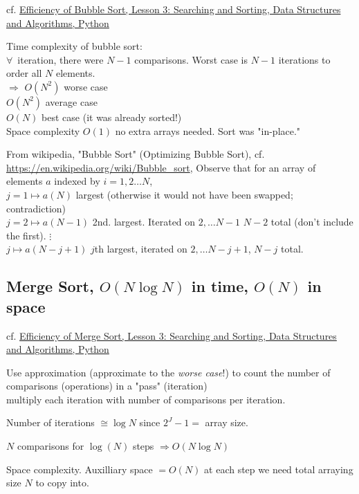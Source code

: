 \documentclass[10pt]{amsart}
\begin{document}
cf. \href{https://classroom.udacity.com/courses/ud513/lessons/7123524086/concepts/71191848070923}{Efficiency of Bubble Sort, Lesson 3: Searching and Sorting, Data Structures and Algorithms, Python}

Time complexity of bubble sort: \\
$\forall \, $ iteration, there were $N-1$ comparisons. Worst case is $N - 1$ iterations to order all $N$ elements. \\
$\Longrightarrow $ $O(N^2)$ worse case \\
\phantom{$\Longrightarrow$} $O(N^2)$ average case \\
\phantom{$\Longrightarrow$} $O(N)$ best case (it was already sorted!) \\

Space complexity $O(1)$ no extra arrays needed. Sort was "in-place."

From wikipedia, "Bubble Sort" (Optimizing Bubble Sort), cf. \url{https://en.wikipedia.org/wiki/Bubble_sort}, Observe that for an array of elements $a$ indexed by $i = 1, 2 \dots N$,  \\
$j = 1 \mapsto a(N) $ largest (otherwise it would not have been swapped; contradiction) \\
$j = 2 \mapsto a(N-1)$ 2nd. largest. Iterated on $ 2, \dots N-1$ $N-2$ total (don't include the first).
$ \vdots$ \\
$ j \mapsto a(N-j +1)$ $j$th largest, iterated on $2, \dots N- j +1$, $N-j$ total.

\subsection{Merge Sort, $O(N \log{N})$ in time, $O(N)$ in space}

cf. \href{https://classroom.udacity.com/courses/ud513/lessons/7123524086/concepts/71254347930923}{Efficiency of Merge Sort, Lesson 3: Searching and Sorting, Data Structures and Algorithms, Python}

Use approximation (approximate to the \emph{worse case}!) to count the number of comparisons (operations) in a "pass" (iteration) \\
multiply each iteration with number of comparisons per iteration.

Number of iterations $\cong \log{N}$ since $2^J - 1 = $ array size. 

$N$ comparisons for $\log{(N)}$ steps $\Longrightarrow O(N \log{N})$

Space complexity. Auxilliary space $=O(N)$ at each step we need total arraying size $N$ to copy into.
\end{document}
